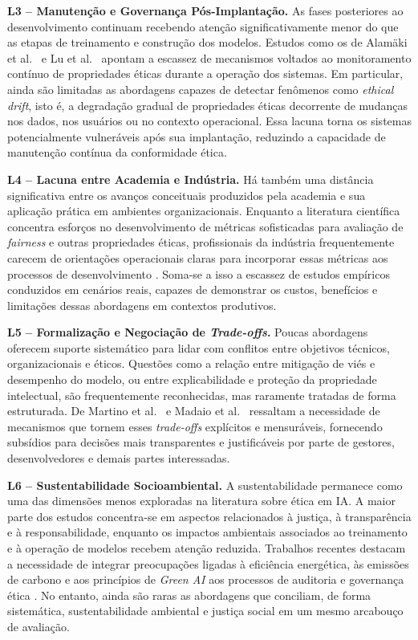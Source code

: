 \textbf{L3 -- Manutenção e Governança Pós-Implantação.} As fases posteriores ao desenvolvimento continuam recebendo atenção significativamente menor do que as etapas de treinamento e construção dos modelos. Estudos como os de Alamäki et al.~\cite{S038} e Lu et al.~\cite{S022} apontam a escassez de mecanismos voltados ao monitoramento contínuo de propriedades éticas durante a operação dos sistemas. Em particular, ainda são limitadas as abordagens capazes de detectar fenômenos como \textit{ethical drift}, isto é, a degradação gradual de propriedades éticas decorrente de mudanças nos dados, nos usuários ou no contexto operacional. Essa lacuna torna os sistemas potencialmente vulneráveis após sua implantação, reduzindo a capacidade de manutenção contínua da conformidade ética.

\textbf{L4 -- Lacuna entre Academia e Indústria.} Há também uma distância significativa entre os avanços conceituais produzidos pela academia e sua aplicação prática em ambientes organizacionais. Enquanto a literatura científica concentra esforços no desenvolvimento de métricas sofisticadas para avaliação de \textit{fairness} e outras propriedades éticas, profissionais da indústria frequentemente carecem de orientações operacionais claras para incorporar essas métricas aos processos de desenvolvimento \cite{S022, S028, S053}. Soma-se a isso a escassez de estudos empíricos conduzidos em cenários reais, capazes de demonstrar os custos, benefícios e limitações dessas abordagens em contextos produtivos.

\textbf{L5 -- Formalização e Negociação de \textit{Trade-offs}.} Poucas abordagens oferecem suporte sistemático para lidar com conflitos entre objetivos técnicos, organizacionais e éticos. Questões como a relação entre mitigação de viés e desempenho do modelo, ou entre explicabilidade e proteção da propriedade intelectual, são frequentemente reconhecidas, mas raramente tratadas de forma estruturada. De Martino et al.~\cite{S040} e Madaio et al.~\cite{S017} ressaltam a necessidade de mecanismos que tornem esses \textit{trade-offs} explícitos e mensuráveis, fornecendo subsídios para decisões mais transparentes e justificáveis por parte de gestores, desenvolvedores e demais partes interessadas.

\textbf{L6 -- Sustentabilidade Socioambiental.} A sustentabilidade permanece como uma das dimensões menos exploradas na literatura sobre ética em IA. A maior parte dos estudos concentra-se em aspectos relacionados à justiça, à transparência e à responsabilidade, enquanto os impactos ambientais associados ao treinamento e à operação de modelos recebem atenção reduzida. Trabalhos recentes destacam a necessidade de integrar preocupações ligadas à eficiência energética, às emissões de carbono e aos princípios de \textit{Green AI} aos processos de auditoria e governança ética \cite{S040, S005}. No entanto, ainda são raras as abordagens que conciliam, de forma sistemática, sustentabilidade ambiental e justiça social em um mesmo arcabouço de avaliação.

